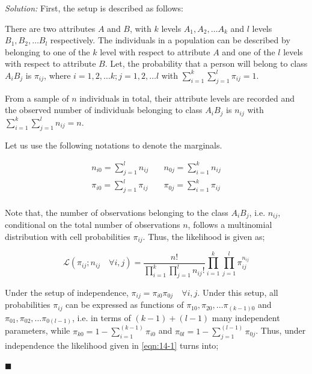 \documentclass[12pt]{article}
\theoremstyle{definition}
\newenvironment{answer}{\textit{Solution: }\quad }{ \hfill $\blacksquare$}
\numberwithin{equation}{section}
\begin{document}
\begin{answer}
    First, the setup is described as follows:
    
    There are two attributes $A$ and $B$, with $k$ levels $A_1, A_2, \dots A_k$ and $l$ levels $B_1, B_2, \dots B_l$ respectively. The individuals in a population can be described by belonging to one of the $k$ level with respect to attribute $A$ and one of the $l$ levels with respect to attribute $B$. Let, the probability that a person will belong to class $A_i B_j$ is $\pi_{ij}$, where $i = 1, 2, \dots k; j = 1, 2, \dots l$ with $\sum_{i=1}^{k} \sum_{j=1}^{l} \pi_{ij} = 1$. 

    From a sample of $n$ individuals in total, their attribute levels are recorded and the observed number of individuals belonging to class $A_iB_j$ is $n_{ij}$ with $\sum_{i=1}^{k} \sum_{j=1}^{l} n_{ij} = n$.

    Let us use the following notations to denote the marginals.

    \begin{align*}
        n_{i0} = \sum_{j = 1}^{l} n_{ij} 
        & \quad n_{0j} = \sum_{i=1}^{k} n_{ij}\\
        \pi_{i0} = \sum_{j = 1}^{l} \pi_{ij} 
        & \quad \pi_{0j} = \sum_{i=1}^{k} \pi_{ij}\\
    \end{align*}

    Note that, the number of observations belonging to the class $A_iB_j$, i.e. $n_{ij}$, conditional on the total number of observations $n$, follows a multinomial distribution with cell probabilities $\pi_{ij}$. Thus, the likelihood is given as;

    \begin{equation}
        \mathcal{L}(\pi_{ij}; n_{ij} \quad \forall i, j)
        = \dfrac{n!}{\prod_{i=1}^{k} \prod_{j=1}^{l} n_{ij}! } \prod_{i=1}^{k} \prod_{j=1}^{l} \pi_{ij}^{n_{ij}}
        \label{eqn:14-1}
    \end{equation}

    Under the setup of independence, $\pi_{ij} = \pi_{i0}\pi_{0j} \quad \forall i, j$. Under this setup, all probabilities $\pi_{ij}$ can be expressed as functions of $\pi_{10}, \pi_{20}, \dots \pi_{(k-1)0}$ and $\pi_{01}, \pi_{02}, \dots \pi_{0(l-1)}$, i.e. in terms of $(k-1)+(l-1)$ many independent parameters, while $\pi_{k0} = 1 - \sum_{i=1}^{(k-1)}\pi_{i0}$ and $\pi_{0l} = 1 - \sum_{j=1}^{(l-1)}\pi_{0j}$. Thus, under independence the likelihood given in \cref{eqn:14-1} turns into;


\end{answer}
\end{document}
